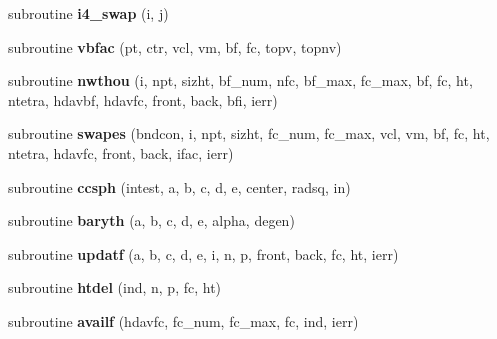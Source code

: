 \begin{DoxyCompactItemize}
\item 
\hypertarget{classgeompack_af761b81a1f9f1919f4fa7398294f0204}{subroutine {\bfseries i4\-\_\-swap} (i, j)}\label{classgeompack_af761b81a1f9f1919f4fa7398294f0204}

\item 
\hypertarget{classgeompack_a1c3d1834ba851e5883085a7538fac325}{subroutine {\bfseries vbfac} (pt, ctr, vcl, vm, bf, fc, topv, topnv)}\label{classgeompack_a1c3d1834ba851e5883085a7538fac325}

\item 
\hypertarget{classgeompack_a47f5b11cf75357fd64f413a95b8c3693}{subroutine {\bfseries nwthou} (i, npt, sizht, bf\-\_\-num, nfc, bf\-\_\-max, fc\-\_\-max, bf, fc, ht, ntetra, hdavbf, hdavfc, front, back, bfi, ierr)}\label{classgeompack_a47f5b11cf75357fd64f413a95b8c3693}

\item 
\hypertarget{classgeompack_ab9776020bebd9214113f936bcad52730}{subroutine {\bfseries swapes} (bndcon, i, npt, sizht, fc\-\_\-num, fc\-\_\-max, vcl, vm, bf, fc, ht, ntetra, hdavfc, front, back, ifac, ierr)}\label{classgeompack_ab9776020bebd9214113f936bcad52730}

\item 
\hypertarget{classgeompack_aad03504a4ad7580a4ce1f95e531fc192}{subroutine {\bfseries ccsph} (intest, a, b, c, d, e, center, radsq, in)}\label{classgeompack_aad03504a4ad7580a4ce1f95e531fc192}

\item 
\hypertarget{classgeompack_a5aa5b559af437154aad3f2244f5d8177}{subroutine {\bfseries baryth} (a, b, c, d, e, alpha, degen)}\label{classgeompack_a5aa5b559af437154aad3f2244f5d8177}

\item 
\hypertarget{classgeompack_a94821d7a86962c544c59783cbbe47741}{subroutine {\bfseries updatf} (a, b, c, d, e, i, n, p, front, back, fc, ht, ierr)}\label{classgeompack_a94821d7a86962c544c59783cbbe47741}

\item 
\hypertarget{classgeompack_a1b15210098b4ac9ad8f4455b58440b82}{subroutine {\bfseries htdel} (ind, n, p, fc, ht)}\label{classgeompack_a1b15210098b4ac9ad8f4455b58440b82}

\item 
\hypertarget{classgeompack_a1393b15dd71c58b324712b49d7b1b6e5}{subroutine {\bfseries availf} (hdavfc, fc\-\_\-num, fc\-\_\-max, fc, ind, ierr)}\label{classgeompack_a1393b15dd71c58b324712b49d7b1b6e5}


\end{DoxyCompactItemize}
